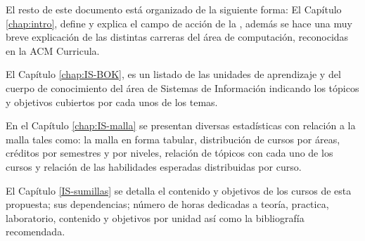 \OtherKeyStones

El resto de este documento está organizado de la siguiente forma: 
El Capítulo \ref{chap:intro}, define y explica el campo de acción 
de la \SchoolShortName, además se hace una muy breve explicación de las 
distintas carreras del área de computación, reconocidas en la ACM Curricula.

% 

% 
% 

El Capítulo \ref{chap:IS-BOK}, es un listado de las unidades de aprendizaje y 
del cuerpo de conocimiento del área de Sistemas de Información indicando los 
tópicos y objetivos cubiertos por cada unos de los temas.

En el Capítulo \ref{chap:IS-malla} se presentan diversas estadísticas con 
relación a la malla tales como: la malla en forma tabular, distribución de 
cursos por áreas, créditos por semestres y por niveles, relación de tópicos 
con cada uno de los cursos y relación de las habilidades esperadas distribuidas 
por curso.

El Capítulo \ref{IS-sumillas} se detalla el contenido y objetivos de los cursos 
de esta propuesta; sus dependencias; número de horas dedicadas a teoría, practica, 
laboratorio, contenido y objetivos por unidad así como la bibliografía recomendada.
